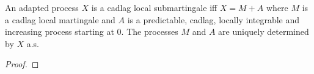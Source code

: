 \begin{theorem}\label{thm:local_doobMeyer}
  \leanok
An adapted process $X$ is a cadlag local submartingale iff $X = M + A$ where $M$ is a cadlag local martingale and $A$ is a predictable, cadlag, locally integrable and increasing process starting at $0$.
The processes $M$ and $A$ are uniquely determined by $X$ a.s.
\end{theorem}

\begin{proof}

\end{proof}
